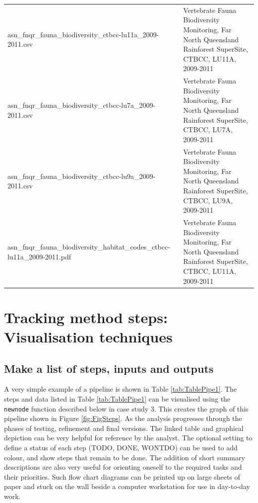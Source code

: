 \documentclass[11pt,a4paper]{article}
\begin{document}
\begin{table}[!h]
\begin{tabular}{p{3.3in}p{3in}}
  asn\_fnqr\_fauna\_biodiversity\_ctbcc-lu11a\_2009-2011.csv & Vertebrate Fauna Biodiversity Monitoring, Far North Queensland Rainforest SuperSite, CTBCC, LU11A, 2009-2011 \\ 
  asn\_fnqr\_fauna\_biodiversity\_ctbcc-lu7a\_2009-2011.csv & Vertebrate Fauna Biodiversity Monitoring, Far North Queensland Rainforest SuperSite, CTBCC, LU7A, 2009-2011 \\ 
  asn\_fnqr\_fauna\_biodiversity\_ctbcc-lu9a\_2009-2011.csv & Vertebrate Fauna Biodiversity Monitoring, Far North Queensland Rainforest SuperSite, CTBCC, LU9A, 2009-2011 \\ 
  asn\_fnqr\_fauna\_biodiversity\_habitat\_codes\_ctbcc-lu11a\_2009-2011.pdf & Vertebrate Fauna Biodiversity Monitoring, Far North Queensland Rainforest SuperSite, CTBCC, LU11A, 2009-2011 \\ 
   \hline
\end{tabular}
\end{table}


\section{Tracking method steps: Visualisation techniques}\label{visualisation-techniques}

\subsection{Make a list of steps, inputs and
outputs}\label{make-a-list-of-steps-inputs-and-outputs}

A very simple example of a pipeline is shown in Table
\ref{tab:TablePipe1}. The steps and data listed in Table
\ref{tab:TablePipe1} can be visualised using the \texttt{newnode}
function described below in case study 3. This creates the graph of this
pipeline shown in Figure \ref{fig:FigSteps}. As the analysis progresses
through the phases of testing, refinement and final versions. The linked
table and graphical depiction can be very helpful for reference by the
analyst. The optional setting to define a status of each step (TODO,
DONE, WONTDO) can be used to add colour, and show steps that remain to
be done. The addition of short summary descriptions are also very useful
for orienting oneself to the required tasks and their priorities. Such
flow chart diagrams can be printed up on large sheets of paper and stuck
on the wall beside a computer workstation for use in day-to-day work.
\end{document}
